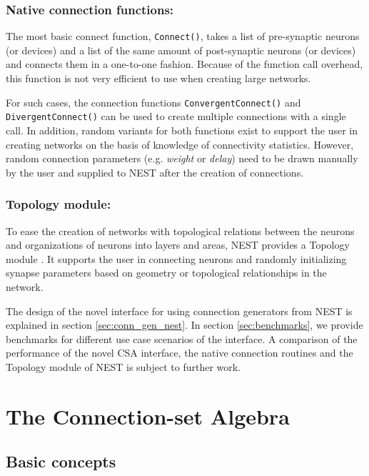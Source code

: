 \documentclass{frontiersSCNS} %
\begin{document}
\subsubsection*{Native connection functions:}

The most basic connect function, \verb|Connect()|, takes a list of
pre-synaptic neurons (or devices) and a list of the same amount of
post-synaptic neurons (or devices) and connects them in a one-to-one
fashion. Because of the function call overhead, this function is not
very efficient to use when creating large networks.

For such cases, the connection functions \verb|ConvergentConnect()|
and \verb|DivergentConnect()| can be used to create multiple
connections with a single call. In addition, random variants for both
functions exist to support the user in creating networks on the basis
of knowledge of connectivity statistics. However, random connection
parameters (e.g. \emph{weight} or \emph{delay}) need to be drawn
manually by the user and supplied to NEST after the creation of
connections.

\subsubsection*{Topology module:}

To ease the creation of networks with topological relations between
the neurons and organizations of neurons into layers and areas, NEST
provides a Topology module \citep{Plesser_13}. It supports the user in
connecting neurons and randomly initializing synapse parameters based
on geometry or topological relationships in the network.

The design of the novel interface for using connection generators from
NEST is explained in section \ref{sec:conn_gen_nest}. In section
\ref{sec:benchmarks}, we provide benchmarks for different use case
scenarios of the interface. A comparison of the performance of the
novel CSA interface, the native connection routines and the Topology
module of NEST is subject to further work.


\section{The Connection-set Algebra}\label{sec:csa}

\subsection{Basic concepts}
\end{document}
